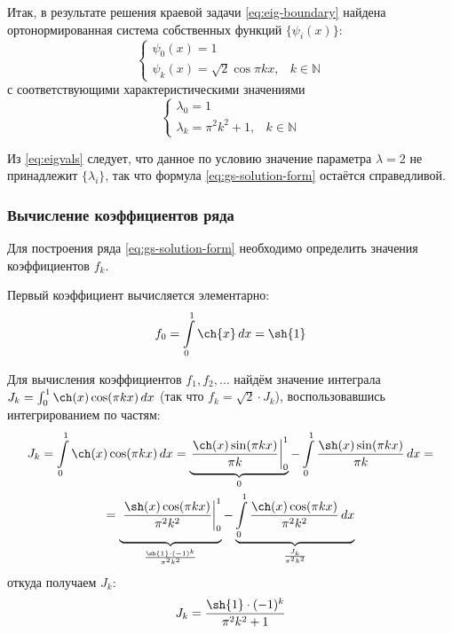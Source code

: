 \documentclass[11pt]{article}
\numberwithin{equation}{section}
\newcommand{\intl}{\int\limits}
\newcommand{\intat}[3]{\left. {#1}\right\vert^{#2}_{#3}}
\newcommand{\set}[1]{\mathbb{#1}}
\begin{document}
Итак, в результате решения краевой задачи \eqref{eq:eig-boundary}
найдена ортонормированная система собственных функций $\{\psi_i(x)\}$:
\begin{equation}
  \label{eq:eigfuns}
  \begin{cases}
    \psi_0(x) = 1 \\
    \psi_k(x) = \sqrt{2} \cos{\pi k x}, & k \in \set{N}
  \end{cases}
\end{equation}
с соответствующими характеристическими значениями
\begin{equation}
  \label{eq:eigvals}
  \begin{cases}
    \lambda_0 = 1 \\
    \lambda_k = \pi^2 k^2 + 1, & k \in \set{N}
  \end{cases}
\end{equation}

Из \eqref{eq:eigvals} следует, что данное по условию значение
параметра $\lambda = 2$ не принадлежит $\{\lambda_i\}$, так что
формула \eqref{eq:gs-solution-form} остаётся справедливой.

\subsubsection{Вычисление коэффициентов ряда}

Для построения ряда \eqref{eq:gs-solution-form} необходимо определить
значения коэффициентов $f_k$.

Первый коэффициент вычисляется элементарно:
\begin{equation}
  f_0 = \intl_0^1 \ch{x} \,dx = \sh{1}
\end{equation}

Для вычисления коэффициентов $f_1, f_2, \dotsc$ найдём значение
интеграла $J_k = \int_0^1{\ch(x) \cos(\pi k x)\,dx}$ (так что $f_k =
\sqrt{2}\cdot J_k$), воспользовавшись интегрированием по частям:
\begin{multline*}
  J_k = \intl_0^1{\ch(x) \cos(\pi k x)\,dx} =
  \underbrace{\intat{\frac{\ch(x)\sin(\pi k x)}{\pi k}}{1}{0}}_0 -
  \intl_0^1\frac{\sh(x) \sin(\pi k x)}{\pi k} \,dx = \\ =
  \underbrace{\vphantom{\intl_0^1}\intat{\frac{\sh(x)\cos(\pi k
        x)}{\pi^2 k^2}}{1}{0}}_{\frac{\sh{1}\cdot (-1)^k}{\pi^2 k^2}}
  - \underbrace{\intl_0^1{\frac{\ch(x) \cos(\pi k x)}{\pi^2
        k^2}\,dx}}_{\frac{J_k}{\pi^2 k^2}}
\end{multline*}
откуда получаем $J_k$:
\begin{gather*}
  J_k = \frac{\sh{1}\cdot (-1)^k}{\pi^2 k^2 + 1}
\end{gather*}
\end{document}
